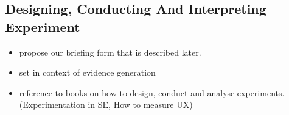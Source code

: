 \subsection{Designing, Conducting And Interpreting Experiment}

\begin{itemize}
	\item propose our briefing form that is described later.
	\item set in context of evidence generation
	\item reference to books on how to design, conduct and analyse experiments. (Experimentation in SE, How to measure UX)
\end{itemize}